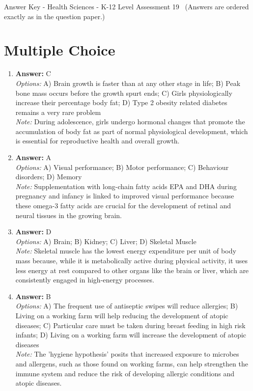 \documentclass[12pt]{article}
\begin{document}
\begin{center}
Answer Key - Health Sciences - K-12 Level Assessment 19 \
\small (Answers are ordered exactly as in the question paper.)
\end{center}

\section*{Multiple Choice}
\begin{enumerate}[label=\arabic*.]
\item \textbf{Answer:} C
\\ \textit{Options:} A) Brain growth is faster than at any other stage in life; B) Peak bone mass occurs before the growth spurt ends; C) Girls physiologically increase their percentage body fat; D) Type 2 obesity related diabetes remains a very rare problem
\\ \textit{Note:} During adolescence, girls undergo hormonal changes that promote the accumulation of body fat as part of normal physiological development, which is essential for reproductive health and overall growth.
\item \textbf{Answer:} A
\\ \textit{Options:} A) Visual performance; B) Motor performance; C) Behaviour disorders; D) Memory
\\ \textit{Note:} Supplementation with long-chain fatty acids EPA and DHA during pregnancy and infancy is linked to improved visual performance because these omega-3 fatty acids are crucial for the development of retinal and neural tissues in the growing brain.
\item \textbf{Answer:} D
\\ \textit{Options:} A) Brain; B) Kidney; C) Liver; D) Skeletal Muscle
\\ \textit{Note:} Skeletal muscle has the lowest energy expenditure per unit of body mass because, while it is metabolically active during physical activity, it uses less energy at rest compared to other organs like the brain or liver, which are consistently engaged in high-energy processes.
\item \textbf{Answer:} B
\\ \textit{Options:} A) The frequent use of antiseptic swipes will reduce allergies; B) Living on a working farm will help reducing the development of atopic diseases; C) Particular care must be taken during breast feeding in high risk infants; D) Living on a working farm will increase the development of atopic diseases
\\ \textit{Note:} The 'hygiene hypothesis' posits that increased exposure to microbes and allergens, such as those found on working farms, can help strengthen the immune system and reduce the risk of developing allergic conditions and atopic diseases.

\end{enumerate}
\end{document}
